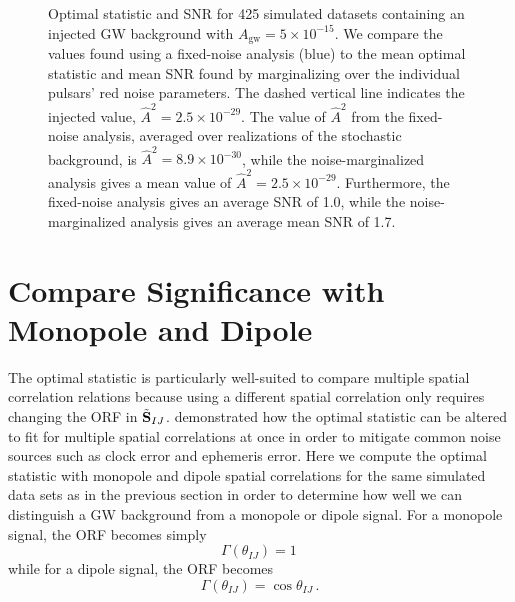 \documentclass[twocolumn,aps,prd,superscriptaddress]{revtex4-1}
\newcommand{\Agw}{\ensuremath{A_\mathrm{gw}}}
\begin{document}
\begin{figure}[ht]
	\caption{Optimal statistic and SNR for 425 simulated datasets 
			containing an injected GW background with $\Agw = 5\times10^{-15}$. 
			We compare the values found using a fixed-noise analysis (blue) to the 
			mean optimal statistic and mean SNR found by marginalizing over 
			the individual pulsars' red noise parameters. The dashed vertical line 
			indicates the injected value, $\hat{A}^2 = 2.5 \times 10^{-29}$. 
			The value of $\hat{A}^2$ from the fixed-noise analysis, 
			averaged over realizations of the stochastic background, is $\hat{A}^2 = 8.9 \times 10^{-30}$, 
			while the noise-marginalized analysis gives a mean value of $\hat{A}^2 = 2.5 \times 10^{-29}$. 
			Furthermore, the fixed-noise analysis gives an average SNR of 1.0, while the 
			noise-marginalized analysis gives an average mean SNR of 1.7.}
	\label{fig:os_datasetstats}
\end{figure}


\section{Compare Significance with Monopole and Dipole}
\label{sec:spatial}

The optimal statistic is particularly well-suited to compare multiple spatial correlation relations 
because using a different spatial correlation only requires changing the ORF 
in $\tilde{{\bf{S}}}_{IJ}$. 
\citet{thk+2016} demonstrated how the optimal statistic can be altered to fit for 
multiple spatial correlations at once in order to mitigate common noise sources such as 
clock error and ephemeris error. 
Here we compute the optimal statistic with monopole and dipole spatial correlations 
for the same simulated data sets as in the previous section in order to determine 
how well we can distinguish a GW background from a monopole or dipole signal. 
For a monopole signal, the ORF becomes simply
\[ \Gamma(\theta_{IJ}) = 1 \,\]
while for a dipole signal, the ORF becomes
\[ \Gamma(\theta_{IJ}) = \cos\theta_{IJ} \,. \]
\end{document}
